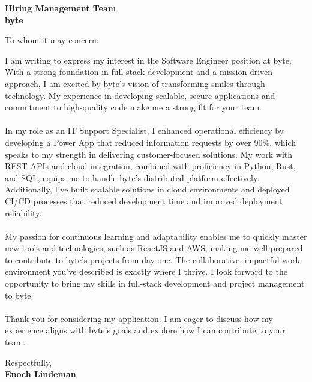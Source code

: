 




\makecvheader

\vspace{1cm}
\textbf{Hiring Management Team}\\
\textbf{byte} \\

\vspace{0.5cm}

\noindent To whom it may concern:

\vspace{0.5cm}

\justifying

I am writing to express my interest in the Software Engineer position at byte. With a strong foundation in full-stack development and a mission-driven approach, I am excited by byte’s vision of transforming smiles through technology. My experience in developing scalable, secure applications and commitment to high-quality code make me a strong fit for your team.
\\\\
In my role as an IT Support Specialist, I enhanced operational efficiency by developing a Power App that reduced information requests by over 90\%, which speaks to my strength in delivering customer-focused solutions. My work with REST APIs and cloud integration, combined with proficiency in Python, Rust, and SQL, equips me to handle byte’s distributed platform effectively. Additionally, I’ve built scalable solutions in cloud environments and deployed CI/CD processes that reduced development time and improved deployment reliability.
\\\\
My passion for continuous learning and adaptability enables me to quickly master new tools and technologies, such as ReactJS and AWS, making me well-prepared to contribute to byte's projects from day one. The collaborative, impactful work environment you’ve described is exactly where I thrive. I look forward to the opportunity to bring my skills in full-stack development and project management to byte.
\\\\
Thank you for considering my application. I am eager to discuss how my experience aligns with byte’s goals and explore how I can contribute to your team.

\vspace{0.5cm}

\noindent Respectfully, \\
\noindent \textbf{Enoch Lindeman}


